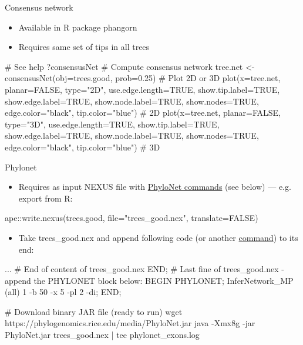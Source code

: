 \documentclass[compress,  xelatex, 11pt, xcolor=x11names, aspectratio=169,
	hyperref={
		bookmarks=true,
		unicode=true,
		colorlinks=true,
		pdftitle={HybSeq course},
		plainpages=false,
		pdfauthor={Vojtech Zeisek},
		pdfsubject={Practical processing of HybSeq target enrichment sequencing data on computing grids like MetaCentrum},
		pdfcreator={XeLaTeX},
		pdfkeywords={BASH, command line, GNU, HybSeq, Linux, MetaCentrum, sequencing shell, target enrichment},
		linkcolor=Turquoise4, %
		anchorcolor=DodgerBlue4, %
		citecolor=DodgerBlue4, %
		filecolor=DodgerBlue4, %
		menucolor=Tan4, %
		urlcolor=DarkOliveGreen4 %
		},
	url={hyphens, lowtilde} %
	]{beamer}
\renewcommand{\texttt}[1]{\colorbox{Cornsilk2}{{\ttfamily #1}}}
\begin{document}
\begin{frame}[fragile]{Consensus network}
	\begin{itemize}
		\item Available in \texttt{R} package \texttt{phangorn}
		\item Requires same set of tips in all trees
	\end{itemize}
	\begin{spluscode}
    # See help
    ?consensusNet
    # Compute consensus network
    tree.net <- consensusNet(obj=trees.good, prob=0.25)
    # Plot 2D or 3D
    plot(x=tree.net, planar=FALSE, type="2D", use.edge.length=TRUE,
      show.tip.label=TRUE, show.edge.label=TRUE, show.node.label=TRUE,
      show.nodes=TRUE, edge.color="black", tip.color="blue") # 2D
    plot(x=tree.net, planar=FALSE, type="3D", use.edge.length=TRUE,
      show.tip.label=TRUE, show.edge.label=TRUE, show.node.label=TRUE,
      show.nodes=TRUE, edge.color="black", tip.color="blue") # 3D
	\end{spluscode}
\end{frame}

\begin{frame}[fragile]{Phylonet}
	\begin{itemize}
		\item Requires as input NEXUS file with \href{https://wiki.rice.edu/confluence/display/PHYLONET/List+of+PhyloNet+Commands}{PhyloNet commands} (see below) --- e.g. export from \texttt{R}:
	\end{itemize}
	\begin{spluscode}
    ape::write.nexus(trees.good, file="trees_good.nex", translate=FALSE)
	\end{spluscode}
	\begin{itemize}
		\item Take \texttt{trees\_good.nex} and append following code (or another \href{https://wiki.rice.edu/confluence/display/PHYLONET/List+of+PhyloNet+Commands}{command}) to its end:
	\end{itemize}
	\begin{bashcode}
    ... # End of content of trees_good.nex
    END; # Last fine of trees_good.nex - append the PHYLONET block below:
    BEGIN PHYLONET;
    InferNetwork_MP (all) 1 -b 50 -x 5 -pl 2 -di;
    END;
	\end{bashcode}
	\begin{bashcode}
    # Download binary JAR file (ready to run)
    wget https://phylogenomics.rice.edu/media/PhyloNet.jar
    java -Xmx8g -jar PhyloNet.jar trees_good.nex | tee phylonet_exons.log
	\end{bashcode}
\end{frame}
\end{document}
